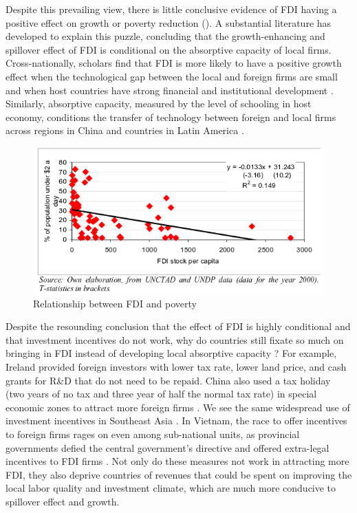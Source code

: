 Despite this prevailing view, there is little conclusive evidence of FDI having a positive effect on growth \citep{Nair-Reichert2001, Carkovic2002} or poverty reduction \citep{Guerra2009} (). A substantial literature has developed to explain this puzzle, concluding that the growth-enhancing and spillover effect of FDI is conditional on the absorptive capacity of local firms. Cross-nationally, scholars find that FDI is more likely to have a positive growth effect when the technological gap between the local and foreign firms are small \citep{Nunnenkamp2004} and when host countries have strong financial and institutional development \citep{ Durham2004}. Similarly, absorptive capacity, measured by the level of schooling in host economy, conditions the transfer of technology between foreign and local firms across regions in China \citep{Fu2008} and countries in Latin America \citep{Willem2004}.

\begin{figure}[!ht]
\includegraphics[width=\textwidth, height=\textheight,keepaspectratio]{../figure/fdi_poverty}
\caption{Relationship between FDI and poverty}
\label{fig:fdipoverty}
\end{figure}

Despite the resounding conclusion that the effect of FDI is highly conditional and that investment incentives do not work, why do countries still fixate so much on bringing in FDI instead of developing local absorptive capacity \citep{Blomstrom2002}? For example, Ireland provided foreign investors with lower tax rate, lower land price, and cash grants for R\&D that do not need to be repaid. China also used a tax holiday (two years of no tax and three year of half the normal tax rate) in special economic zones to attract more foreign firms \citep{Telford2001}. We see the same widespread use of investment incentives in Southeast Asia \citep{Fletcher2002}. In Vietnam, the race to offer incentives to foreign firms rages on even among sub-national units, as provincial governments defied the central government's directive and offered extra-legal incentives to FDI firms \citep{Vu2007}. Not only do these measures not work in attracting more FDI, they also deprive countries of revenues that could be spent on improving the local labor quality and investment climate, which are much more conducive to spillover effect and growth.

